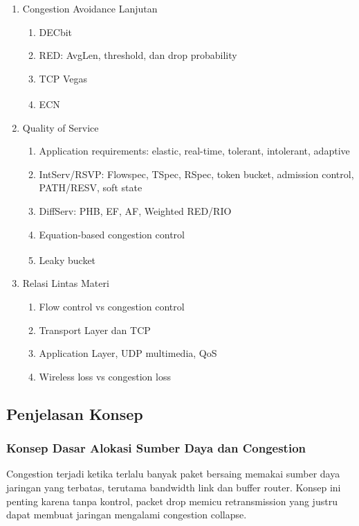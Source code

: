 \begin{enumerate}
\begin{enumerate}
    \end{enumerate}
    \item \pwajib Congestion Avoidance Lanjutan
    \begin{enumerate}
        \item \ppaham DECbit
        \item \pwajib RED: AvgLen, threshold, dan drop probability
        \item \ppaham TCP Vegas
        \item \ppaham ECN\textsuperscript{\dag}
    \end{enumerate}
    \item \pwajib Quality of Service
    \begin{enumerate}
        \item \pwajib Application requirements: elastic, real-time, tolerant, intolerant, adaptive
        \item \pwajib IntServ/RSVP: Flowspec, TSpec, RSpec, token bucket, admission control, PATH/RESV, soft state
        \item \pwajib DiffServ: PHB, EF, AF, Weighted RED/RIO
        \item \ppaham Equation-based congestion control
        \item \ppaham Leaky bucket\textsuperscript{\dag}
    \end{enumerate}
    \item \pwajib Relasi Lintas Materi
    \begin{enumerate}
        \item \pwajib Flow control vs congestion control
        \item \pwajib Transport Layer dan TCP
        \item \ppaham Application Layer, UDP multimedia, QoS
        \item \pwajib Wireless loss vs congestion loss
    \end{enumerate}
\end{enumerate}

\subsection{Penjelasan Konsep}

\subsubsection{Konsep Dasar Alokasi Sumber Daya dan Congestion}
\begin{jawab}
Congestion terjadi ketika terlalu banyak paket bersaing memakai sumber daya jaringan yang terbatas, terutama bandwidth link dan buffer router. Konsep ini penting karena tanpa kontrol, packet drop memicu retransmission yang justru dapat membuat jaringan mengalami congestion collapse.
\end{jawab}

